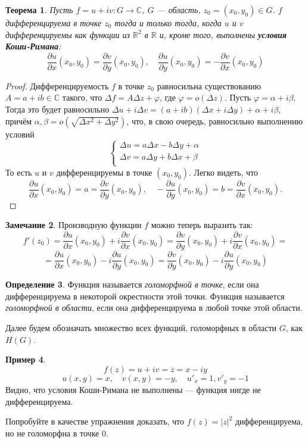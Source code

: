 \documentclass[11pt,openany,a4paper]{scrartcl}
\theoremstyle{plain}
\newtheorem{theorem}{Теорема}[section]
\theoremstyle{definition}
\newtheorem{definition}[theorem]{Определение}
\newtheorem{remark}[theorem]{Замечание}
\newtheorem{example}[theorem]{Пример}
\newcommand\mb{\mathbb}
\newcommand\real{\mb R}
\newcommand{\complex}{\mb C}
\newcommand{\pd}[2]{\frac{\partial #1}{\partial #2}}
\begin{document}
\begin{theorem}
	Пусть $f = u + iv: G  \to \complex$, $G$ — область, $z_0 = (x_0, y_0) \in G$. $f$ дифференцируема в точке
	$z_0$ тогда и только тогда, когда $u$ и $v$ дифференцируемы как функции из $\real^2$ в $\real$ и, кроме того,
	выполнены \textbf{условия Коши-Римана}:
	$$
	\frac{\partial u}{\partial x} (x_0, y_0) = \frac{\partial v}{\partial y} (x_0, y_0),\quad
	\frac{\partial u}{\partial y}(x_0, y_0) = -\frac{\partial v}{\partial x} (x_0, y_0)
	$$
\end{theorem}
\begin{proof}
	Дифференцируемость $f$ в точке $z_0$ равносильна существованию\\$A = a + ib \in \complex$ такого, что
	$\Delta f = A\Delta z + \varphi$, где $\varphi = o(\Delta z)$. Пусть $\varphi = \alpha + i\beta$. Тогда это
	будет равносильно $\Delta u + i\Delta v = (a + ib)(\Delta x + i\Delta y) + \alpha + i\beta$, причём $\alpha,
	\beta = o(\sqrt{\Delta x^2 + \Delta y^2})$, что, в свою очередь, равносильно выполнению условий
	$$
	\begin{cases}
		\Delta u = a\Delta x - b\Delta y + \alpha\\
		\Delta v = a\Delta y + b\Delta x + \beta\\
	\end{cases}
	$$
	То есть $u$ и $v$ дифференцируемы в точке $(x_0, y_0)$. Легко видеть, что
	$$
	\frac{\partial u}{\partial x} (x_0, y_0) = a = \frac{\partial v}{\partial y} (x_0, y_0), \quad
	-\frac{\partial u}{\partial y} (x_0, y_0) = b = \frac{\partial v}{\partial x}(x_0, y_0).
	$$
\end{proof}
\begin{remark}
	Производную функции $f$ можно теперь выразить так: $$
	f'(z_0) = \pd{u}{x}(x_0, y_0) + i\pd{v}{x}(x_0, y_0) = \pd{v}{y}(x_0, y_0) + i\pd{v}{x}(x_0, y_0) =
	$$
	$$
	= \pd{u}{x}(x_0, y_0) - i\pd{u}{y}(x_0, y_0) = \pd{v}{y}(x_0, y_0) - i\pd{u}{y}(x_0, y_0)
	$$
\end{remark}
\begin{definition}
	Функция называется \emph{голоморфной в точке}, если она дифференцируема в некоторой окрестности этой точки.
	Функция называется \emph{голоморфной в области}, если она дифференцируема в любой точке этой области.
\end{definition}
Далее будем обозначать множество всех функций, голоморфных в области $G$, как $H(G)$.

\begin{example}
	$$
	f(z) = u + iv = \overline z = x - iy
	$$
	$$
	u(x, y) = x,\quad v(x, y) = -y,\quad u'_x = 1, v'_y = -1
	$$
	Видно, что условия Коши-Римана не выполнены — функция нигде не дифференцируема.
\end{example}
Попробуйте в качестве упражнения доказать, что $f(z) = |z|^2$ дифференцируема, но не голоморфна в точке $0$.
\end{document}

